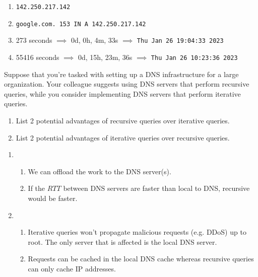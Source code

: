 \documentclass{report}
\begin{document}
\begin{problem}
\begin{enumerate}
\end{enumerate}


\begin{answer}{50em}
  \begin{enumerate}[label=(\alph*)]
  \item \texttt{142.250.217.142}
  \item \texttt{google.com.		153	IN	A	142.250.217.142}
  \item 273 seconds $\implies$ 0d, 0h, 4m, 33s $\implies$ \texttt{Thu Jan 26 19:04:33 2023}
  \item 55416 seconds $\implies$ 0d, 15h, 23m, 36s $\implies$ \texttt{Thu Jan 26 10:23:36 2023}
  \end{enumerate}

\end{answer}

\end{problem}


\newpage

\newpage

\begin{problem}
Suppose that you're tasked with setting up a DNS infrastructure for a large organization. Your colleague suggests using DNS servers that perform recursive queries, while you consider implementing DNS servers that perform iterative queries.
\begin{enumerate}
\item List 2 potential advantages of recursive queries over iterative queries.
\item List 2 potential advantages of iterative queries over recursive queries.

\end{enumerate}


\begin{answer}{40em}
  \begin{enumerate}[label=(\alph*)]
    \item
    \begin{enumerate}[label=\textit{(\roman*)}]
    \item We can offload the work to the DNS server(s).
    \item If the $RTT$ between DNS servers are faster than local to DNS, recursive would be faster.
    \end{enumerate}

    \item
    \begin{enumerate}[label=\textit{(\roman*)}]
    \item Iterative queries won't propagate malicious requests (e.g. DDoS) up to root. The only
      server that is affected is the local DNS server.
    \item Requests can be cached in the local DNS cache whereas recursive queries can only cache IP
      addresses.
    \end{enumerate}
  \end{enumerate}


\end{answer}
\end{problem}
\end{document}
